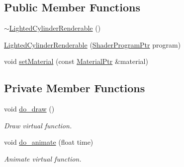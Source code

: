 \subsection*{Public Member Functions}
\begin{DoxyCompactItemize}
\item 
\hyperlink{classLightedCylinderRenderable_a099f169da178f08e3b3e1c39873ff54e}{$\sim$\+Lighted\+Cylinder\+Renderable} ()
\item 
\hyperlink{classLightedCylinderRenderable_a77e38146024a45063d5874ac176bf84f}{Lighted\+Cylinder\+Renderable} (\hyperlink{ShaderProgram_8hpp_af8e4af1ad4c53875ee5d32ab7e1f4966}{Shader\+Program\+Ptr} program)
\item 
void \hyperlink{classLightedCylinderRenderable_af63ed94be5df5dc25a58c01b44a2e82d}{set\+Material} (const \hyperlink{Material_8hpp_a1d47cd05ca683e287435cf0b363fbfe1}{Material\+Ptr} \&material)
\end{DoxyCompactItemize}
\subsection*{Private Member Functions}
\begin{DoxyCompactItemize}
\item 
void \hyperlink{classLightedCylinderRenderable_a327da1ffb8ac46a01b4c8057ea532acb}{do\+\_\+draw} ()
\begin{DoxyCompactList}\small\item\em Draw virtual function. \end{DoxyCompactList}\item 
void \hyperlink{classLightedCylinderRenderable_a7ecf5b614bf6e98335e9b46edfc64e67}{do\+\_\+animate} (float time)
\begin{DoxyCompactList}\small\item\em Animate virtual function. \end{DoxyCompactList}\end{DoxyCompactItemize}
